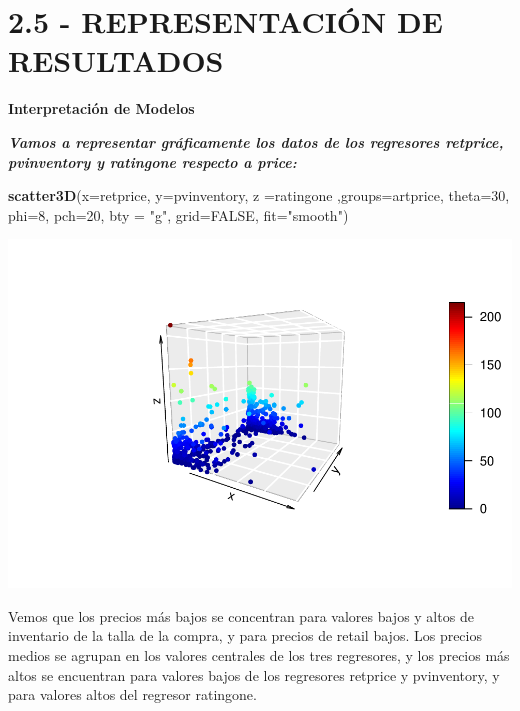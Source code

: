 \documentclass[
]{article}
\newenvironment{Shaded}{\begin{snugshade}}{\end{snugshade}}
\newcommand{\DataTypeTok}[1]{\textcolor[rgb]{0.13,0.29,0.53}{#1}}
\newcommand{\DecValTok}[1]{\textcolor[rgb]{0.00,0.00,0.81}{#1}}
\newcommand{\KeywordTok}[1]{\textcolor[rgb]{0.13,0.29,0.53}{\textbf{#1}}}
\newcommand{\NormalTok}[1]{#1}
\newcommand{\OtherTok}[1]{\textcolor[rgb]{0.56,0.35,0.01}{#1}}
\newcommand{\StringTok}[1]{\textcolor[rgb]{0.31,0.60,0.02}{#1}}
\begin{document}
\hypertarget{representaciuxf3n-de-resultados}{%
\section{2.5 - REPRESENTACIÓN DE
RESULTADOS}\label{representaciuxf3n-de-resultados}}

\textbf{Interpretación de Modelos}

\textbf{\emph{Vamos a representar gráficamente los datos de los
regresores retprice, pvinventory y ratingone respecto a price:}}

\begin{Shaded}
\begin{Highlighting}[]
\KeywordTok{scatter3D}\NormalTok{(}\DataTypeTok{x=}\NormalTok{retprice, }\DataTypeTok{y=}\NormalTok{pvinventory, }\DataTypeTok{z =}\NormalTok{ratingone ,}\DataTypeTok{groups=}\NormalTok{artprice, }\DataTypeTok{theta=}\DecValTok{30}\NormalTok{, }\DataTypeTok{phi=}\DecValTok{8}\NormalTok{, }\DataTypeTok{pch=}\DecValTok{20}\NormalTok{, }\DataTypeTok{bty =} \StringTok{"g"}\NormalTok{, }
          \DataTypeTok{grid=}\OtherTok{FALSE}\NormalTok{, }\DataTypeTok{fit=}\StringTok{"smooth"}\NormalTok{)}
\end{Highlighting}
\end{Shaded}

\includegraphics{PRAC2_Limpieza_Analisis_Datos---Sales_files/figure-latex/unnamed-chunk-61-1.pdf}

Vemos que los precios más bajos se concentran para valores bajos y altos
de inventario de la talla de la compra, y para precios de retail bajos.
Los precios medios se agrupan en los valores centrales de los tres
regresores, y los precios más altos se encuentran para valores bajos de
los regresores retprice y pvinventory, y para valores altos del regresor
ratingone.
\end{document}
